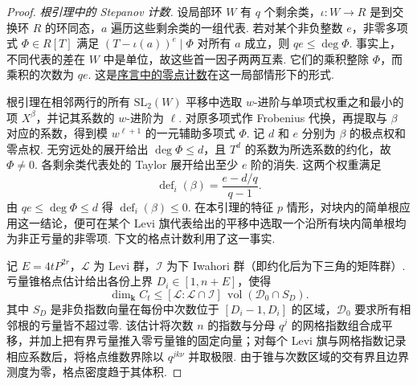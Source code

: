 \begin{proof}
\label{par:a-stepanov-count}
\emph{根引理中的 Stepanov 计数.} 设局部环 $W$ 有 $q$ 个剩余类，$\iota:W\to R$ 是到交换环 $R$ 的环同态，$a$ 遍历这些剩余类的一组代表. 若对某个非负整数 $e$，非零多项式 $\Phi\in R[T]$ 满足 $(T-\iota(a))^e\mid\Phi$ 对所有 $a$ 成立，则 $qe\le\deg\Phi$. 事实上，不同代表的差在 $W$ 中是单位，故这些首一因子两两互素. 它们的乘积整除 $\Phi$，而乘积的次数为 $qe$. 这是\hyperref[par:stepanov-method]{序言中的零点计数}在这一局部情形下的形式.

根引理在相邻两行的所有 $\mathrm{SL}_2(W)$ 平移中选取 $w$-进阶与单项式权重之和最小的项 $X^\beta$，并记其系数的 $w$-进阶为 $\ell$. 对原多项式作 Frobenius 代换，再提取与 $\beta$ 对应的系数，得到模 $w^{\ell+1}$ 的一元辅助多项式 $\Phi$. 记 $d$ 和 $e$ 分别为 $\beta$ 的极点权和零点权. 无穷远处的展开给出 $\deg\Phi\le d$，且 $T^d$ 的系数为所选系数的约化，故 $\Phi\ne0$. 各剩余类代表处的 Taylor 展开给出至少 $e$ 阶的消失. 这两个权重满足
\[
 \operatorname{def}_i(\beta)=\frac{e-d/q}{q-1}.
\]
由 $qe\le\deg\Phi\le d$ 得 $\operatorname{def}_i(\beta)\le0$. 在本引理的特征 $p$ 情形，对块内的简单根应用这一结论，便可在某个 Levi 旗代表给出的平移中选取一个沿所有块内简单根均为非正亏量的非零项. 下文的格点计数利用了这一事实.

记 $E=4tP^{2r}$，$\mathcal L$ 为 Levi 群，$\mathcal I$ 为下 Iwahori 群（即约化后为下三角的矩阵群）. 亏量锥格点估计给出各份上界 $D_i\in[1,n+E]$，使得
\[
 \dim_{\mathbf k} C_t
 \le [\mathcal L:\mathcal L\cap\mathcal I]\,
       \operatorname{vol}(\mathcal D_0\cap S_D).
\]
其中 $S_D$ 是非负指数向量在每份中次数位于 $[D_i-1,D_i]$ 的区域，$\mathcal D_0$ 要求所有相邻根的亏量皆不超过零. 该估计将次数 $n$ 的指数与分母 $q^j$ 的网格指数组合成平移，并加上把有界亏量推入零亏量锥的固定向量；对每个 Levi 旗与网格指数记录相应系数后，将格点维数界除以 $q^{j k\nu}$ 并取极限. 由于锥与次数区域的交有界且边界测度为零，格点密度趋于其体积.


\end{proof}
